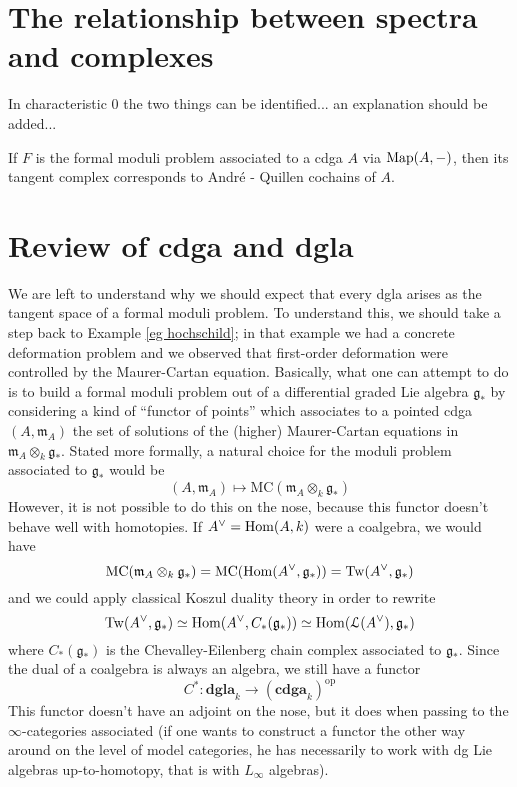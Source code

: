 \begin{refsection}
\section{The relationship between spectra and complexes}

In characteristic $0$ the two things can be identified... an explanation should be added...

\begin{eg}
If $F$ is the formal moduli problem associated to a cdga $A$ via $\operatorname{\mathrm{Map}}(A,-)$, then its tangent complex corresponds to Andr\'e - Quillen cochains of $A$.
\end{eg}

\section{Review of cdga and dgla}

We are left to understand why we should expect that every dgla arises as the tangent space of a formal moduli problem. To understand this, we should take a step back to Example \ref{eg hochschild}; in that example we had a concrete deformation problem and we observed that first-order deformation were controlled by the Maurer-Cartan equation. Basically, what one can attempt to do is to build a formal moduli problem out of a differential graded Lie algebra $\mathfrak g_*$ by considering a kind of ``functor of points'' which associates to a pointed cdga $(A,\mathfrak m_A)$ the set of solutions of the (higher) Maurer-Cartan equations in $\mathfrak m_A \otimes_k \mathfrak g_*$. Stated more formally, a natural choice for the moduli problem associated to $\mathfrak g_*$ would be
\[
(A, \mathfrak m_A) \mapsto \mathrm{MC}(\mathfrak m_A \otimes_k \mathfrak g_*)
\]
However, it is not possible to do this on the nose, because this functor doesn't behave well with homotopies. If $A^\vee = \mathrm{Hom}(A,k)$ were a coalgebra, we would have
\[
\mathrm{MC}(\mathfrak m_A \otimes_k \mathfrak g_*) = \mathrm{MC}(\mathrm{Hom}(A^\vee, \mathfrak g_*)) = \mathrm{Tw}(A^\vee, \mathfrak g_*)
\]
and we could apply classical Koszul duality theory in order to rewrite
\[
\mathrm{Tw}(A^\vee, \mathfrak g_*) \simeq \mathrm{Hom}(A^\vee, C_*(\mathfrak g_*)) \simeq \mathrm{Hom}(\mathcal L(A^\vee), \mathfrak g_*)
\]
where $C_*(\mathfrak g_*)$ is the Chevalley-Eilenberg chain complex associated to $\mathfrak g_*$. Since the dual of a coalgebra is always an algebra, we still have a functor
\[
C^* \colon \mathbf{dgla}_k \to (\mathbf{cdga}_k)^{\mathrm{op}}
\]
This functor doesn't have an adjoint on the nose, but it does when passing to the $\infty$-categories associated (if one wants to construct a functor the other way around on the level of model categories, he has necessarily to work with dg Lie algebras up-to-homotopy, that is with $L_\infty$ algebras).


\end{refsection}
